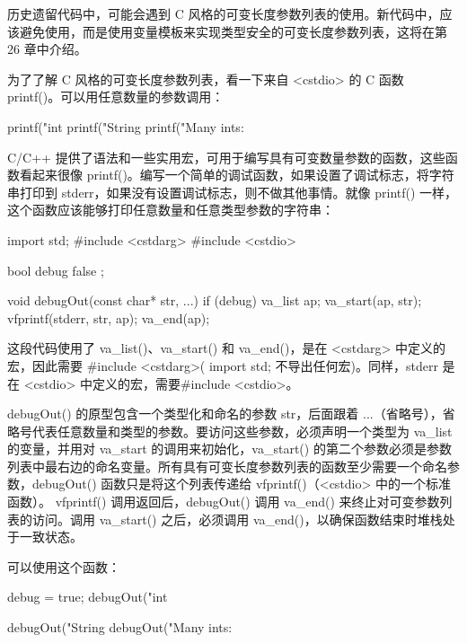 

历史遗留代码中，可能会遇到 C 风格的可变长度参数列表的使用。新代码中，应该避免使用，而是使用变量模板来实现类型安全的可变长度参数列表，这将在第 26 章中介绍。

为了了解 C 风格的可变长度参数列表，看一下来自 <cstdio> 的 C 函数 printf()。可以用任意数量的参数调用：

\begin{cpp}
printf("int %
printf("String %
printf("Many ints: %
\end{cpp}

C/C++ 提供了语法和一些实用宏，可用于编写具有可变数量参数的函数，这些函数看起来很像 printf()。编写一个简单的调试函数，如果设置了调试标志，将字符串打印到 stderr，如果没有设置调试标志，则不做其他事情。就像 printf() 一样，这个函数应该能够打印任意数量和任意类型参数的字符串：

\begin{cpp}
import std;
#include <cstdarg>
#include <cstdio>

bool debug { false };

void debugOut(const char* str, ...)
{
    if (debug) {
        va_list ap;
        va_start(ap, str);
        vfprintf(stderr, str, ap);
        va_end(ap);
    }
}
\end{cpp}

这段代码使用了 va\_list()、va\_start() 和 va\_end()，是在 <cstdarg> 中定义的宏，因此需要 \#include <cstdarg>( import std; 不导出任何宏)。同样，stderr 是在 <cstdio> 中定义的宏，需要\#include <cstdio>。

debugOut() 的原型包含一个类型化和命名的参数 str，后面跟着 ...（省略号），省略号代表任意数量和类型的参数。要访问这些参数，必须声明一个类型为 va\_list 的变量，并用对 va\_start 的调用来初始化，va\_start() 的第二个参数必须是参数列表中最右边的命名变量。所有具有可变长度参数列表的函数至少需要一个命名参数，debugOut() 函数只是将这个列表传递给 vfprintf()（<cstdio> 中的一个标准函数）。 vfprintf() 调用返回后，debugOut() 调用 va\_end() 来终止对可变参数列表的访问。调用 va\_start() 之后，必须调用 va\_end()，以确保函数结束时堆栈处于一致状态。

可以使用这个函数：

\begin{cpp}
debug = true;
debugOut("int %

debugOut("String %
debugOut("Many ints: %
\end{cpp}

